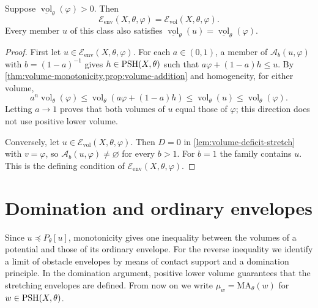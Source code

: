 \begin{theorem}\label{thm:relative-equivalence}
Suppose $\underline{\operatorname{vol}}_\theta(\varphi)>0$. Then
\[
 \mathcal E_{\mathrm{env}}(X,\theta,\varphi)
 =\mathcal E_{\mathrm{vol}}(X,\theta,\varphi).
\]
Every member $u$ of this class also satisfies
$\underline{\operatorname{vol}}_\theta(u)
=\underline{\operatorname{vol}}_\theta(\varphi)$.
\end{theorem}
\begin{proof}
First let $u\in\mathcal E_{\mathrm{env}}(X,\theta,\varphi)$. For each $a\in(0,1)$, a member of $\mathcal A_b(u,\varphi)$ with $b=(1-a)^{-1}$ gives $h\in\mathrm{PSH}(X,\theta)$ such that $a\varphi+(1-a)h\leq u$. By \cref{thm:volume-monotonicity,prop:volume-addition} and homogeneity, for either volume,
\[
 a^n\operatorname{vol}_\theta(\varphi)
 \leq\operatorname{vol}_\theta(a\varphi+(1-a)h)
 \leq\operatorname{vol}_\theta(u)
 \leq\operatorname{vol}_\theta(\varphi).
\]
Letting $a\to1$ proves that both volumes of $u$ equal those of $\varphi$; this direction does not use positive lower volume.

Conversely, let $u\in\mathcal E_{\mathrm{vol}}(X,\theta,\varphi)$. Then $D=0$ in \cref{lem:volume-deficit-stretch} with $v=\varphi$, so $\mathcal A_b(u,\varphi)\neq\varnothing$ for every $b>1$. For $b=1$ the family contains $u$. This is the defining condition of $\mathcal E_{\mathrm{env}}(X,\theta,\varphi)$.
\end{proof}

\section{Domination and ordinary envelopes}

Since $u\preceq P_\theta[u]$, monotonicity gives one inequality between the volumes of a potential and those of its ordinary envelope. For the reverse inequality we identify a limit of obstacle envelopes by means of contact support and a domination principle. In the domination argument, positive lower volume guarantees that the stretching envelopes are defined. From now on we write $\mu_w=\mathrm{MA}_\theta(w)$ for $w\in\mathrm{PSH}(X,\theta)$.

